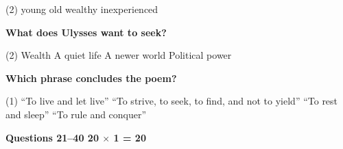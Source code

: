 \documentclass[12pt,a4paper]{exam}
\begin{document}
\begin{questions}
\begin{minipage}{\textwidth}
		\begin{tasks}(2)
			\task young
			\task old
			\task wealthy
			\task inexperienced
		\end{tasks}
	\end{minipage}


	\begin{minipage}{\textwidth}
		\question \textbf{What does Ulysses want to seek?}

		\begin{tasks}(2)
			\task Wealth
			\task A quiet life
			\task A newer world
			\task Political power
		\end{tasks}
	\end{minipage}


	\begin{minipage}{\textwidth}
		\question \textbf{Which phrase concludes the poem?}

		\begin{tasks}(1)
			\task ``To live and let live''
			\task ``To strive, to seek, to find, and not to yield''
			\task ``To rest and sleep''
			\task ``To rule and conquer''
		\end{tasks}
	\end{minipage}

\end{questions}


\begin{center}
\end{center}

\textbf{Questions 21--40 \hfill 20 $\times$ 1 = 20}

\vspace{4pt}
\end{document}
